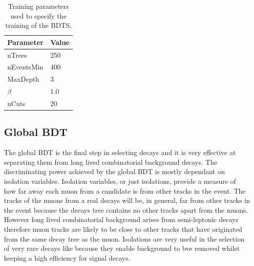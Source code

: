 \begin{table}[htbp]
\begin{center}
\begin{tabular}{ll}
\hline
Parameter & Value \\ \hline
nTrees & 250 \\
nEventsMin & 400 \\
MaxDepth & 3 \\
$\beta$ & 1.0 \\
nCuts & 20 \\
\hline
\end{tabular}
\vspace{0.7cm}
\caption{Training parameters used to specify the training of the BDTS.}
\label{tab:BDTStrainingparams}
\end{center}
\end{table}

\subsection{Global BDT}
\label{sec:globalBDT}

The global BDT is the final step in selecting \bsmumu decays and it is very effective at separating them from long lived combinatorial background decays. The discriminating power achieved by the global BDT is mostly dependant on isolation variables. Isolation variables, or just isolations, provide a measure of how far away each muon from a \bsmumu candidate is from other tracks in the event. The tracks of the muons from a real \bsmumu decays will be, in general, far from other tracks in the event because the \bsmumu decays tree contains no other tracks apart from the muons. However long lived combinatorial background arises from semi-leptonic decays therefore muon tracks are likely to be close to other tracks that have originated from the same decay tree as the muon. %
Isolations are very useful in the selection of very rare decays like \bsmumu because they enable background to bve removed whilst keeping a high efficiency for signal decays.

